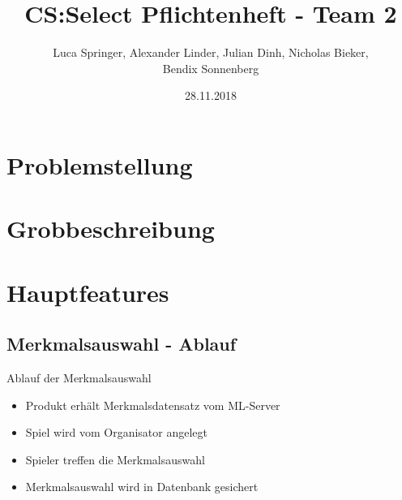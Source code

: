\documentclass[xcolor=dvipsnames]{beamer}
\title[Team 2 - Pflichtenheft]{CS:Select Pflichtenheft - Team 2}
\author{Luca Springer, Alexander Linder, Julian Dinh, Nicholas Bieker,\\ Bendix Sonnenberg}
\date{28.11.2018}
\begin{document}
\begin{frame} %
  \titlepage
\end{frame}
\section{Problemstellung}
\section{Grobbeschreibung}
\section{Hauptfeatures}
\subsection{Merkmalsauswahl - Ablauf}
\begin{frame}
    \begin{block}{Ablauf der Merkmalsauswahl}
        \begin{itemize}
            \item Produkt erhält Merkmalsdatensatz vom ML-Server
            \item Spiel wird vom Organisator angelegt
            \item Spieler treffen die Merkmalsauswahl
            \item Merkmalsauswahl wird in Datenbank gesichert
        \end{itemize}
    \end{block}
\end{frame}
\end{document}
